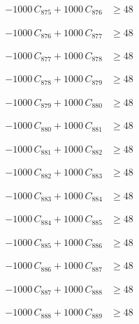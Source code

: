 \documentclass[a4paper,11pt]{article}
\begin{document}
\begin{align}
-1000\,C_{875} + 1000\,C_{876} &\geq 48 \nonumber
\end{align}

\begin{align}
-1000\,C_{876} + 1000\,C_{877} &\geq 48 \nonumber
\end{align}

\begin{align}
-1000\,C_{877} + 1000\,C_{878} &\geq 48 \nonumber
\end{align}

\begin{align}
-1000\,C_{878} + 1000\,C_{879} &\geq 48 \nonumber
\end{align}

\begin{align}
-1000\,C_{879} + 1000\,C_{880} &\geq 48 \nonumber
\end{align}

\begin{align}
-1000\,C_{880} + 1000\,C_{881} &\geq 48 \nonumber
\end{align}

\begin{align}
-1000\,C_{881} + 1000\,C_{882} &\geq 48 \nonumber
\end{align}

\begin{align}
-1000\,C_{882} + 1000\,C_{883} &\geq 48 \nonumber
\end{align}

\begin{align}
-1000\,C_{883} + 1000\,C_{884} &\geq 48 \nonumber
\end{align}

\begin{align}
-1000\,C_{884} + 1000\,C_{885} &\geq 48 \nonumber
\end{align}

\begin{align}
-1000\,C_{885} + 1000\,C_{886} &\geq 48 \nonumber
\end{align}

\begin{align}
-1000\,C_{886} + 1000\,C_{887} &\geq 48 \nonumber
\end{align}

\begin{align}
-1000\,C_{887} + 1000\,C_{888} &\geq 48 \nonumber
\end{align}

\begin{align}
-1000\,C_{888} + 1000\,C_{889} &\geq 48 \nonumber
\end{align}
\end{document}
